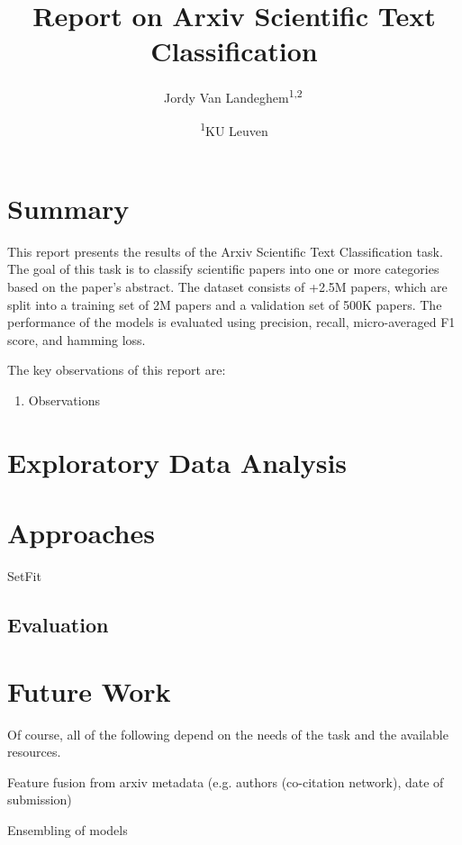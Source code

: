 \documentclass[10pt,letterpaper]{article}
\begin{document}
\title{Report on Arxiv Scientific Text Classification} %

\newcommand{\superaffil}[2]{\textsuperscript{#1}\,#2}

\author{
  \small Jordy Van Landeghem\superaffil{1,2}
  \and
  \footnotesize{
    \textsuperscript{1}KU Leuven
  }
}

\maketitle

\section{Summary}

This report presents the results of the Arxiv Scientific Text Classification task. The goal of this task is to classify scientific papers into one or more categories based on the paper's abstract. The dataset consists of +2.5M papers, which are split into a training set of 2M papers and a validation set of 500K papers. The performance of the models is evaluated using precision, recall, micro-averaged F1 score, and hamming loss.


\noindent The key observations of this report are:
\begin{enumerate}
  [label=\Roman*.,leftmargin=2\parindent]
  \item  Observations
\end{enumerate}


\section{Exploratory Data Analysis}

\section{Approaches}

SetFit \cite{tunstall2022efficient}


\subsection{Evaluation}

\section{Future Work}

Of course, all of the following depend on the needs of the task and the available resources.

\begin{todolist}
  \item Feature fusion from arxiv metadata (e.g. authors (co-citation network), date of submission)
  \item Ensembling of models
\end{todolist}

{\small


}
\end{document}
